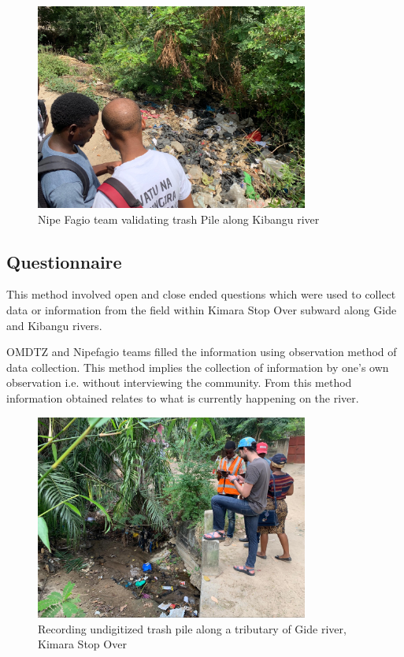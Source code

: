 \documentclass[a4paper,12pt,twoside]{article}
\begin{document}
    \begin{figure} %
        \centering
        \includegraphics[width=0.8\textwidth]{images/image5.jpg}
        \caption{Nipe Fagio team validating trash Pile along Kibangu river}
    \end{figure}

\subsection{Questionnaire}

    This method involved open and close ended questions which were used to collect data or information from the field within Kimara Stop Over subward along Gide and Kibangu rivers.

    OMDTZ and Nipefagio teams filled the information using observation method of data collection. This method implies the collection of information by one’s own observation i.e. without interviewing the community. From this method information obtained relates to what is currently happening on the river.
    
    \begin{figure} %
        \centering
        \includegraphics[width=0.8\textwidth]{images/image8.jpg}
        \caption{Recording undigitized trash pile along a tributary of Gide river, Kimara Stop Over}
    \end{figure}
\end{document}

